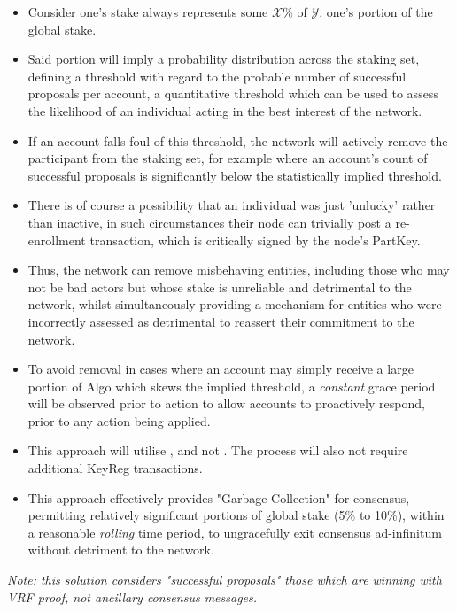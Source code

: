 \documentclass[11pt,a4paper]{article}
\begin{document}
\begin{itemize}
    \item Consider one's stake always represents some $\mathcal{X}\%$ of $\mathcal{Y}$, one's portion of the global 
          stake.
    \item Said portion will imply a probability distribution across the staking set, defining a threshold with regard to 
          the probable number of successful proposals per account, a quantitative threshold which can be used to assess 
          the likelihood of an individual acting in the best interest of the network.
    \item If an account falls foul of this threshold, the network will actively remove the participant from the staking
          set, for example where an account's count of successful proposals is significantly below the statistically 
          implied threshold.
    \item There is of course a possibility that an individual was just 'unlucky' rather than inactive, in such 
          circumstances their node can trivially post a re-enrollment transaction, which is critically signed by the 
          node's \gls{PartKey}.
    \item Thus, the network can remove misbehaving entities, including those who may not be bad actors but whose stake 
          is unreliable and detrimental to the network, whilst simultaneously providing a mechanism for entities who
          were incorrectly assessed as detrimental to reassert their commitment to the network.
    \item To avoid removal in cases where an account may simply receive a large portion of Algo which skews the implied 
          threshold, a \emph{constant} grace period will be observed prior to action to allow accounts to proactively
          respond, prior to any action being applied.
    \item This approach will utilise , and not . The process will
          also not require additional \gls{KeyReg} transactions.
    \item This approach effectively provides "Garbage Collection" for consensus, permitting relatively significant 
          portions of global stake (5\% to 10\%), within a reasonable \emph{rolling} time period, to ungracefully exit 
          consensus ad-infinitum without detriment to the network. 
\end{itemize}

\emph{Note: this solution considers "successful proposals" those which are winning with VRF proof, not ancillary 
      consensus messages.} 
\end{document}
